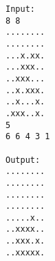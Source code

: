 \begin{verbatim}
Input:
8 8
........
........
...x.xx.
...xxx..
..xxx...
..x.xxx.
..x...x.
.xxx..x.
5
6 6 4 3 1

Output:
........
........
........
........
.....x..
..xxxx..
..xxx.x.
..xxxxx.
\end{verbatim}